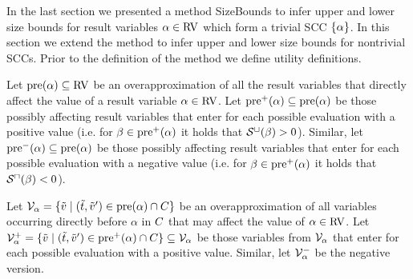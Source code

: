 In the last section we presented a method SizeBounds to infer upper and lower size bounds for result variables $\alpha \in \text{RV}$ which form a trivial SCC $\lbrace \alpha \rbrace$.
In this section we extend the method to infer upper and lower size bounds for nontrivial SCCs.
Prior to the definition of the method we define utility definitions.

\begin{definition}
  Let $\text{pre}(\alpha) \subseteq \text{RV}$ be an overapproximation of all the result variables that directly affect the value of a result variable $\alpha \in \text{RV}$.
  Let $\text{pre}^+(\alpha) \subseteq \text{pre}(\alpha)$ be those possibly affecting result variables that enter for each possible evaluation with a positive value
  (i.e. for $\beta \in \text{pre}^+(\alpha)$ it holds that ${\mathcal{S}^\sqcup}(\beta) > 0$).
  Similar, let $\text{pre}^-(\alpha) \subseteq \text{pre}(\alpha)$ be those possibly affecting result variables that enter for each possible evaluation with a negative value
  (i.e. for $\beta \in \text{pre}^+(\alpha)$ it holds that ${\mathcal{S}^\sqcap}(\beta) < 0$).
\end{definition}

\begin{definition}
  Let $\mathcal{V}_\alpha = \lbrace  \tilde{v} \mid (\tilde{t}, \tilde{v}') \in \text{pre}(\alpha) \cap C  \rbrace$ be an overapproximation of all variables occurring directly before $\alpha$ in $C$ that may affect the value of $\alpha \in \text{RV}$.
  Let $\mathcal{V}^+_\alpha = \lbrace  \tilde{v} \mid (\tilde{t}, \tilde{v}') \in \text{pre}^+(\alpha) \cap C  \rbrace \subseteq \mathcal{V}_\alpha$ be those variables from $\mathcal{V}_\alpha$ that enter for each possible evaluation with a positive value.
  Similar, let $\mathcal{V}^-_\alpha$ be the negative version.
\end{definition}

